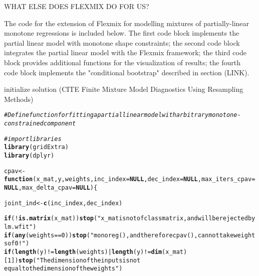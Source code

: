 \documentclass[10pt]{olplainarticle}\usepackage[]{graphicx}\usepackage[]{color}
\makeatletter
\newcommand{\hlnum}[1]{\textcolor[rgb]{0.686,0.059,0.569}{#1}}%
\newcommand{\hlstr}[1]{\textcolor[rgb]{0.192,0.494,0.8}{#1}}%
\newcommand{\hlcom}[1]{\textcolor[rgb]{0.678,0.584,0.686}{\textit{#1}}}%
\newcommand{\hlopt}[1]{\textcolor[rgb]{0,0,0}{#1}}%
\newcommand{\hlstd}[1]{\textcolor[rgb]{0.345,0.345,0.345}{#1}}%
\newcommand{\hlkwa}[1]{\textcolor[rgb]{0.161,0.373,0.58}{\textbf{#1}}}%
\newcommand{\hlkwb}[1]{\textcolor[rgb]{0.69,0.353,0.396}{#1}}%
\newcommand{\hlkwc}[1]{\textcolor[rgb]{0.333,0.667,0.333}{#1}}%
\newcommand{\hlkwd}[1]{\textcolor[rgb]{0.737,0.353,0.396}{\textbf{#1}}}%
\newenvironment{kframe}{%
 \def\at@end@of@kframe{}%
 \ifinner\ifhmode%
  \def\at@end@of@kframe{\end{minipage}}%
  \begin{minipage}{\columnwidth}%
 \fi\fi%
 \def\FrameCommand##1{\hskip\@totalleftmargin \hskip-\fboxsep
 \colorbox{shadecolor}{##1}\hskip-\fboxsep
     \hskip-\linewidth \hskip-\@totalleftmargin \hskip\columnwidth}%
 \MakeFramed {\advance\hsize-\width
   \@totalleftmargin\z@ \linewidth\hsize
   \@setminipage}}%
 {\par\unskip\endMakeFramed%
 \at@end@of@kframe}
\newenvironment{knitrout}{}{} %
\makeatother
\begin{document}
\begin{appendices}
WHAT ELSE DOES FLEXMIX DO FOR US?

The code for the extension of Flexmix for modelling mixtures of partially-linear monotone regressions is included below. The first code block implements the partial linear model with monotone shape constraints; the second code block integrates the partial linear model with the Flexmix framework; the third code block provides additional functions for the visualization of results; the fourth code block implements the "conditional bootstrap" described in section (LINK).

initialize solution (CITE Finite Mixture Model Diagnostics Using Resampling Methods)


\begin{knitrout}
\color{fgcolor}\begin{kframe}
\begin{alltt}
\hlcom{# Define function for fitting a partial linear model with arbitrary monotone-constrained component}

\hlcom{# import libraries}
\hlkwd{library}\hlstd{(gridExtra)}
\hlkwd{library}\hlstd{(dplyr)}


\hlstd{cpav} \hlkwb{<-} \hlkwa{function}\hlstd{(}\hlkwc{x_mat}\hlstd{,} \hlkwc{y}\hlstd{,} \hlkwc{weights}\hlstd{,} \hlkwc{inc_index}\hlstd{=}\hlkwa{NULL}\hlstd{,} \hlkwc{dec_index}\hlstd{=}\hlkwa{NULL}\hlstd{,} \hlkwc{max_iters_cpav}\hlstd{=}\hlkwa{NULL}\hlstd{,} \hlkwc{max_delta_cpav}\hlstd{=}\hlkwa{NULL}\hlstd{)\{}

  \hlstd{joint_ind} \hlkwb{<-} \hlkwd{c}\hlstd{(inc_index, dec_index)}

  \hlkwa{if}\hlstd{(}\hlopt{!}\hlkwd{is.matrix}\hlstd{(x_mat))} \hlkwd{stop}\hlstd{(}\hlstr{"x_mat is not of class matrix, and will be rejected by lm.wfit"}\hlstd{)}
  \hlkwa{if}\hlstd{(}\hlkwd{any}\hlstd{(weights} \hlopt{==} \hlnum{0}\hlstd{))} \hlkwd{stop}\hlstd{(}\hlstr{"monoreg(), and therefore cpav(), cannot take weights of 0!"}\hlstd{)}
  \hlkwa{if}\hlstd{(}\hlkwd{length}\hlstd{(y)} \hlopt{!=} \hlkwd{length}\hlstd{(weights)} \hlopt{|} \hlkwd{length}\hlstd{(y)} \hlopt{!=} \hlkwd{dim}\hlstd{(x_mat)[}\hlnum{1}\hlstd{])} \hlkwd{stop}\hlstd{(}\hlstr{"The dimension of the inputs is not 
                                        equal to the dimension of the weights"}\hlstd{)}


\end{alltt}
\end{kframe}
\end{knitrout}
\end{appendices}
\end{document}
